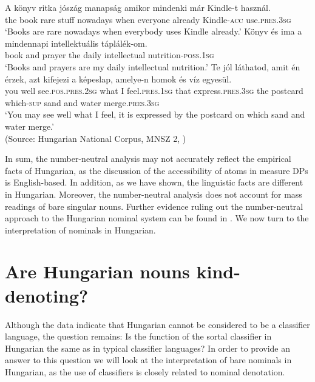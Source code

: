 \documentclass[output=paper]{langscibook}
\begin{document}
\ea \label{schv-nem:ex:34}
\gll A könyv ritka jószág manapság amikor mindenki már Kindle-t használ. \\  
 the book rare stuff nowadays when everyone already Kindle-\textsc{acc} use.\textsc{pres}.\textsc{3sg}\\ 
\glt `Books are rare  nowadays when everybody uses Kindle already.'
\ex \label{schv-nem:ex:35}
\gll Könyv és ima a mindennapi intellektuális táplálék-om.%
\\
book   and  prayer  the daily      intellectual    nutrition-\textsc{poss}.\textsc{1sg}\\ 
\glt `Books and prayers are my daily intellectual nutrition.'
\ex \label{schv-nem:ex:36}
\gll Te jól láthatod, amit én érzek, azt kifejezi a képeslap, amelye-n homok és víz egyesül.\\  
 you well see.\textsc{pos}.\textsc{pres}.\textsc{2sg}  what I feel.\textsc{pres}.\textsc{1sg} that express.\textsc{pres}.\textsc{3sg} the postcard which-\textsc{sup} sand and water merge.\textsc{pres}.\textsc{3sg}\\ 
\glt `You may see well what I feel, it is expressed by the postcard on which sand and water merge.' \\\hfill (Source: Hungarian National Corpus, MNSZ 2, \citealt{oravecz-14})
\z

\noindent In sum, the number-neutral analysis may not accurately reflect the empirical facts of Hungarian, as the discussion of the accessibility of atoms in measure DPs is English-based. In addition, as we have shown, the linguistic facts are different in Hungarian. Moreover, the  number-neutral analysis does not account for mass readings of bare singular nouns. Further evidence ruling out the number-neutral approach to the Hungarian nominal system can be found in \citet{schvarcz-nemes-19}.  We now turn to the interpretation of nominals in Hungarian. 

\section{Are Hungarian nouns kind-denoting?} \label{schv-nem:sec:4}

Although the data indicate that Hungarian cannot be considered to be a classifier language, the question remains: Is the function of the sortal classifier in Hungarian the same as in typical classifier languages? In order to provide an answer to this question we will look at the interpretation of bare nominals in Hungarian, as the use of classifiers is closely related to nominal denotation. 
\end{document}
